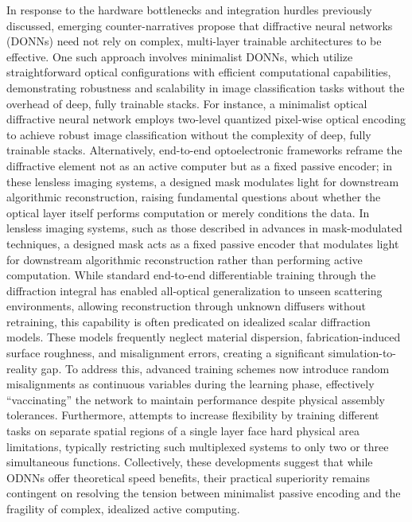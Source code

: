 \documentclass[11pt]{article}
\begin{document}
In response to the hardware bottlenecks and integration hurdles previously discussed, emerging counter-narratives propose that diffractive neural networks (DONNs) need not rely on complex, multi-layer trainable architectures to be effective. One such approach involves minimalist DONNs, which utilize straightforward optical configurations with efficient computational capabilities, demonstrating robustness and scalability in image classification tasks without the overhead of deep, fully trainable stacks. For instance, a minimalist optical diffractive neural network employs two-level quantized pixel-wise optical encoding to achieve robust image classification without the complexity of deep, fully trainable stacks. \citep{doi_10_1002_lpor_202402303_1f555bd4} Alternatively, end-to-end optoelectronic frameworks reframe the diffractive element not as an active computer but as a fixed passive encoder; in these lensless imaging systems, a designed mask modulates light for downstream algorithmic reconstruction, raising fundamental questions about whether the optical layer itself performs computation or merely conditions the data. In lensless imaging systems, such as those described in advances in mask-modulated techniques, a designed mask acts as a fixed passive encoder that modulates light for downstream algorithmic reconstruction rather than performing active computation. \citep{doi_10_3390_electronics13030617_5b341306} While standard end-to-end differentiable training through the diffraction integral has enabled all-optical generalization to unseen scattering environments, allowing reconstruction through unknown diffusers without retraining, this capability is often predicated on idealized scalar diffraction models. These models frequently neglect material dispersion, fabrication-induced surface roughness, and misalignment errors, creating a significant simulation-to-reality gap. To address this, advanced training schemes now introduce random misalignments as continuous variables during the learning phase, effectively ``vaccinating'' the network to maintain performance despite physical assembly tolerances. Furthermore, attempts to increase flexibility by training different tasks on separate spatial regions of a single layer face hard physical area limitations, typically restricting such multiplexed systems to only two or three simultaneous functions. Collectively, these developments suggest that while ODNNs offer theoretical speed benefits, their practical superiority remains contingent on resolving the tension between minimalist passive encoding and the fragility of complex, idealized active computing. \citep{doi_10_1038_s41377_022_00725_8_57c4c704} \citep{doi_10_1002_lpor_202402303_1f555bd4} \citep{doi_10_48550_arxiv_2411_05748_a91b6f61} \citep{doi_10_3390_electronics13030617_5b341306} \citep{doi_10_1515_nanoph_2020_0291_c4a9f42d}
\end{document}
